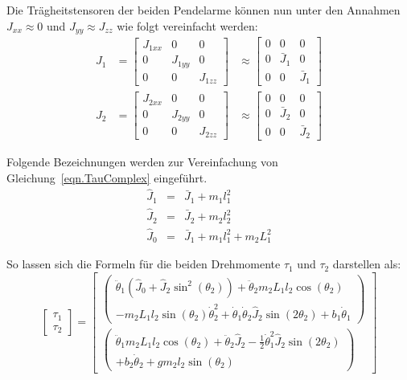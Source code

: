 Die Trägheitstensoren der beiden Pendelarme können nun unter den Annahmen $J_{xx} \approx 0$ und $J_{yy} \approx J_{zz}$ wie folgt vereinfacht werden: 
\begin{align}
\label{eqn.Tragheitstensoren}
J_1&=
\begin{bmatrix}
J_{1xx} & 0 & 0\\
0 & J_{1yy} & 0\\
0 & 0 & J_{1zz}
\end{bmatrix}
&\approx
\begin{bmatrix}
0 & 0 & 0\\
0 & \bar{J}_{1} & 0\\
0 & 0 & \bar{J}_{1}
\end{bmatrix}
\nonumber \\
J_2&=
\begin{bmatrix}
J_{2xx} & 0 & 0\\
0 & J_{2yy} & 0\\
0 & 0 & J_{2zz}
\end{bmatrix}
&\approx
\begin{bmatrix}
0 & 0 & 0\\
0 & \bar{J}_{2} & 0\\
0 & 0 & \bar{J}_{2}
\end{bmatrix}
\end{align}

Folgende Bezeichnungen werden zur Vereinfachung von Gleichung~\ref{eqn.TauComplex} eingeführt.
\begin{eqnarray}
\hat{J}_1 &=& \bar{J}_1 + m_1l^2_1	\nonumber	\\
\hat{J}_2 &=& \bar{J}_2 + m_2l^2_2	\nonumber	\\
\hat{J}_0 &=& \bar{J}_1 + m_1l^2_1 + m_2L^2_1
\end{eqnarray}

So lassen sich die Formeln für die beiden Drehmomente $\tau_1$ und $\tau_2$ darstellen als:
\begin{equation}
\begin{bmatrix}
\tau_1 \\
\tau_2
\end{bmatrix}
=
\begin{bmatrix}
\begin{pmatrix}
\ddot{\theta}_1(\hat{J}_0+\hat{J}_2\sin^2(\theta_2))+\ddot{\theta}_2m_2L_1l_2\cos(\theta_2)			\\
-m_2L_1l_2\sin(\theta_2)\dot{\theta}^2_2+\dot{\theta}_1\dot{\theta}_2\hat{J}_2\sin(2\theta_2)+b_1\dot{\theta}_1
\end{pmatrix}
\\
\begin{pmatrix}
\ddot{\theta}_1m_2L_1l_2\cos(\theta_2)+\ddot{\theta}_2\hat{J}_2-\frac{1}{2}\dot{\theta}^2_1\hat{J}_2\sin(2\theta_2)						\\
+b_2\dot{\theta}_2+gm_2l_2\sin(\theta_2)
\end{pmatrix}
\end{bmatrix}
\end{equation}


